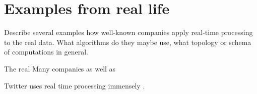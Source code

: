 \section{Examples from real life}

Describe several examples how well-known companies apply real-time processing to the real data.
What algorithms do they maybe use, what topology or schema of computations in general.

The real
Many companies as well as 

Twitter uses real time processing immensely \cite{Toshniwal2014} \cite{Boykin2013}.

